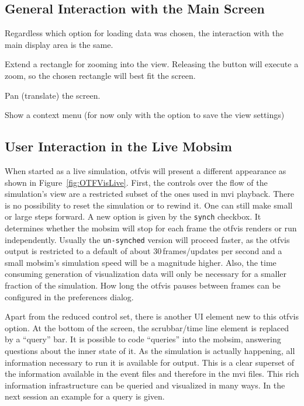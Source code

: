 \subsection{General Interaction with the Main Screen}
Regardless which option for loading data was chosen, the interaction with the main display area is the same.
%
\begin{description}\styleDescription
\item[Right button drag:] Extend a rectangle for zooming into the view. Releasing the button will execute a zoom, so the chosen rectangle will best fit the screen.
\item[Middle-Mouse-drag:] Pan (translate) the screen.
\item[Right-Mouse-Click:] Show a context menu (for now only with the option to save the view settings)
\end{description}

\subsection{User Interaction in the Live Mobsim}
When started as a live simulation, \gls{otfvis} will present a different appearance as shown in Figure~\ref{fig:OTFVisLive}. 
First, the controls over the flow of the simulation's view are a restricted subset of the ones used in \gls{mvi} playback. 
There is no possibility to reset the simulation or to rewind it. 
One can still make small or large steps forward. 
A new option is given by the \lstinline|synch| checkbox. 
It determines whether the \gls{mobsim} will stop for each frame the \gls{otfvis} renders or run independently. 
Usually the \lstinline|un-synched| version will proceed faster, as the \gls{otfvis} output is restricted to a default of about 30\,frames/updates per second and a small \gls{mobsim}'s simulation speed will be a magnitude higher. 
Also, the time consuming generation of visualization data will only be necessary for a smaller fraction of the simulation. 
How long the \gls{otfvis} pauses between frames can be configured in the preferences dialog.

Apart from the reduced control set, there is another UI element new to this \gls{otfvis} option. 
At the bottom of the screen, the scrubbar/time line element is replaced by a ``query'' bar. 
It is possible to code ``queries'' into the \gls{mobsim}, answering questions about the inner state of it. 
As the simulation is actually happening, all information necessary to run it is available for output. 
This is a clear superset of the information available in the event files and therefore in the \gls{mvi} files. 
This rich information infrastructure can be queried and visualized in many ways. 
In the next session an example for a query is given.

